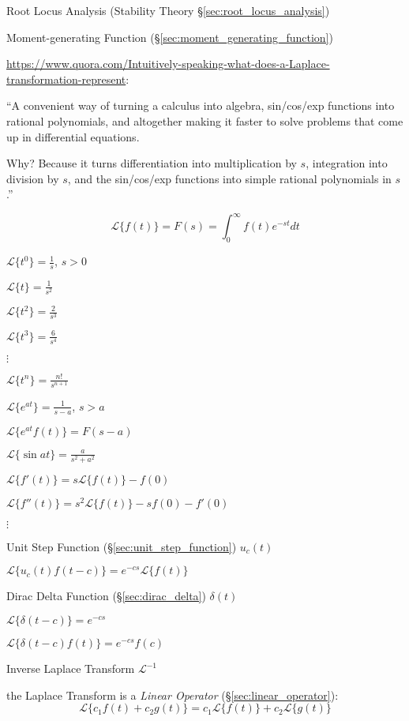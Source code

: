 \fist Root Locus Analysis (Stability Theory \S\ref{sec:root_locus_analysis})

\fist Moment-generating Function (\S\ref{sec:moment_generating_function})

\url{https://www.quora.com/Intuitively-speaking-what-does-a-Laplace-transformation-represent}:

``A convenient way of turning a calculus into algebra, sin/cos/exp functions
into rational polynomials, and altogether making it faster to solve problems
that come up in differential equations.

Why? Because it turns differentiation into multiplication by $s$, integration
into division by $s$, and the sin/cos/exp functions into simple rational
polynomials in $s$.''

\[
  \mathcal{L} \{ f(t) \} = F(s) = \int_0^\infty f(t) e^{-st} dt
\]

$\mathcal{L}\{t^0\} = \frac{1}{s}$, $s > 0$

$\mathcal{L}\{t\} = \frac{1}{s^2}$

$\mathcal{L}\{t^2\} = \frac{2}{s^3}$

$\mathcal{L}\{t^3\} = \frac{6}{s^4}$

$\vdots$

$\mathcal{L}\{t^n\} = \frac{n!}{s^{n+1}}$

$\mathcal{L}\{e^{at}\} = \frac{1}{s-a}$, $s > a$

$\mathcal{L}\{e^{at}f(t)\} = F(s-a)$

$\mathcal{L}\{\sin at\} = \frac{a}{s^2+a^2}$

$\mathcal{L}\{ f'(t) \} = s \mathcal{L} \{f(t)\} - f(0)$

$\mathcal{L}\{ f''(t) \} = s^2 \mathcal{L} \{f(t)\} - sf(0) - f'(0)$

$\vdots$

Unit Step Function (\S\ref{sec:unit_step_function}) $u_c(t)$

$\mathcal{L}\{ u_c(t)f(t-c) \} = e^{-cs}\mathcal{L}\{f(t)\}$

Dirac Delta Function (\S\ref{sec:dirac_delta}) $\delta(t)$

$\mathcal{L}\{ \delta(t-c) \} = e^{-cs}$

$\mathcal{L}\{ \delta(t-c)f(t) \} = e^{-cs}f(c) $

Inverse Laplace Transform $\mathcal{L}^{-1}$

the Laplace Transform is a \emph{Linear Operator}
(\S\ref{sec:linear_operator}):
\[
  \mathcal{L} \{ c_1 f(t) + c_2 g(t) \}
    = c_1\mathcal{L}\{f(t)\} + c_2\mathcal{L}\{g(t)\}
\]

